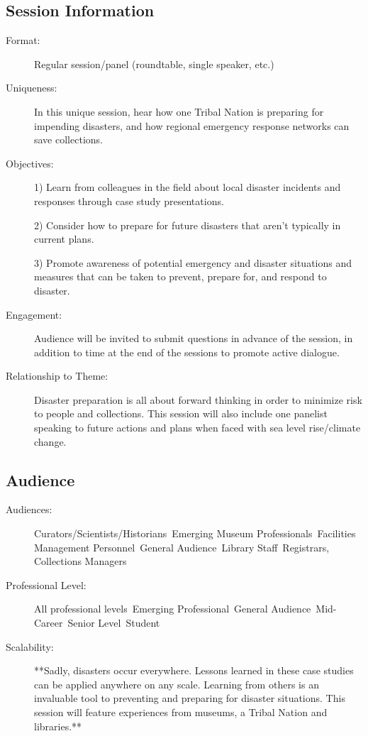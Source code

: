 \documentclass{report}
\begin{document}
              \subsection*{Session Information}
                \begin{description}
                  \item [Format:] Regular session/panel (roundtable, single speaker, etc.)
							    
							    \item [Uniqueness:]In this unique session, hear how one Tribal Nation is preparing for impending disasters, and how regional emergency response networks can save collections.
							    \item [Objectives:]1) Learn from colleagues in the field about local disaster incidents and responses through case study presentations.

2) Consider how to prepare for future disasters that aren’t typically in current plans.

3) Promote awareness of potential emergency and disaster situations and measures that can be taken to prevent, prepare for, and respond to disaster.
							    \item [Engagement:]Audience will be invited to submit questions in advance of the session, in addition to time at the end of the sessions to promote active dialogue.
							    \item [Relationship to Theme:]Disaster preparation is all about forward thinking in order to minimize risk to people and collections. This session will also include one panelist speaking to future actions and plans when faced with sea level rise/climate change.
							    
                \end{description}
              \subsection*{Audience}
                \begin{description}
                  \item [Audiences:]Curators/Scientists/Historians~Emerging Museum Professionals~Facilities Management Personnel~General Audience~Library Staff~Registrars, Collections Managers~
                  \item[Professional Level:]All professional levels~Emerging Professional~General Audience~Mid-Career~Senior Level~Student~
                \item[Scalability:] **Sadly, disasters occur everywhere. Lessons learned in these case studies can be applied anywhere on any scale. Learning from others is an invaluable tool to preventing and preparing for disaster situations. This session will feature experiences from museums, a Tribal Nation and libraries.**

							
              \end{description}
\end{document}
